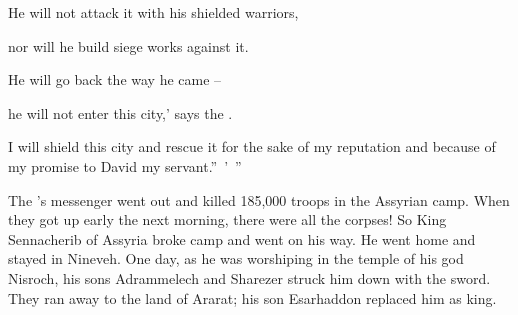 {\par }{\Q He will not
attack
it with his shielded
warriors,

\par }{\Q nor
will he build siege
works against it.
\par }{\Q {}He will go back
the way
he came
–
\par }{\Q he will not
enter
this
city,’
says
the {}.
\par }{\Q {}I will shield
this
city
and rescue
it for
the sake
of my reputation
and because of my promise to David
my servant.” ’ ”
\par }{\PP {}The
{}’s
messenger
went out
and killed
185,000
troops in the Assyrian
camp.
When they got up early
the next morning,
there
were all
the corpses!
So King
Sennacherib
of Assyria
broke
camp and went
on his way. He went home
and stayed
in Nineveh.
One day, as he was worshiping
in the temple
of his god
Nisroch,
his sons
Adrammelech
and Sharezer
struck
him down
with the sword.
They
ran
away to the land
of Ararat;
his son
Esarhaddon
replaced
him as king.

\par }
